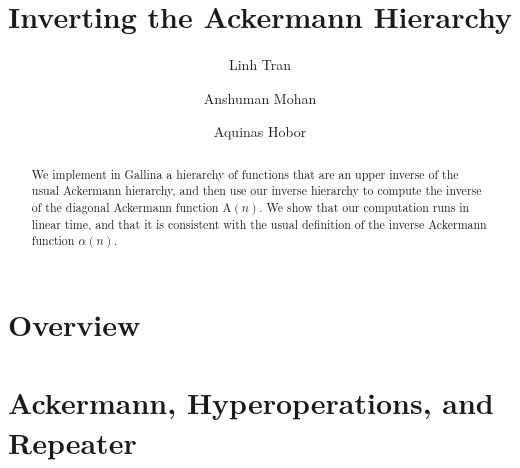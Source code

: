 \documentclass[a4paper,USenglish,cleveref, autoref]{lipics-v2019}
\title{Inverting the Ackermann Hierarchy}
\author{Linh Tran}{National University of Singapore}{}{}{}%
\author{Anshuman Mohan}{National University of Singapore}{}{}{}%
\author{Aquinas Hobor}{National University of Singapore}{}{}{}
\newcommand{\Ack}{\ensuremath{\text{A}}}
\theoremstyle{plain}
\theoremstyle{definition}
\begin{document}
\maketitle







\begin{abstract}
We implement in Gallina a hierarchy of functions that are an upper inverse
of the {\color{magenta}usual Ackermann hierarchy}, and then use our inverse
hierarchy to compute the inverse of the diagonal Ackermann
function $\Ack(n)$. We show that our computation runs in linear time,
and that it is consistent with the usual definition
of the inverse Ackermann function $\alpha(n)$.
\end{abstract}



\section{Overview}
\label{sec: overview}


\section{Ackermann, Hyperoperations, and Repeater}
\label{sec: countdown-repeater}

\end{document}
